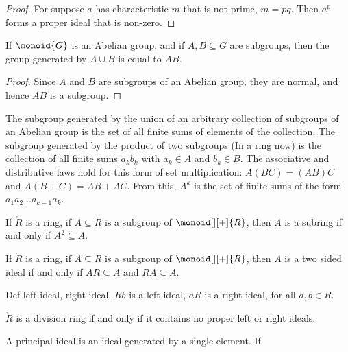 \documentclass{book}                                                           %
\begin{document}
            \begin{proof}
                For suppose $a$ has characteristic $m$ that is not prime,
                $m=pq$. Then $a^{p}$ forms a proper ideal that is non-zero.
            \end{proof}
            \begin{theorem}
                If $\monoid{G}$ is an Abelian group, and if
                $A,B\subseteq{G}$ are subgroups, then the group generated
                by $A\cup{B}$ is equal to $AB$.
            \end{theorem}
            \begin{proof}
                Since $A$ and $B$ are subgroups of an Abelian group, they
                are normal, and hence $AB$ is a subgroup.
            \end{proof}
            The subgroup generated by the union of an arbitrary collection
            of subgroups of an Abelian group is the set of all finite sums
            of elements of the collection. The subgroup generated by the
            product of two subgroups (In a ring now) is the collection of
            all finite sums $a_{k}b_{k}$ with $a_{k}\in{A}$ and
            $b_{k}\in{B}$. The associative and distributive laws hold for
            this form of set multiplication: $A(BC)=(AB)C$ and
            $A(B+C)=AB+AC$. From this, $A^{k}$ is the set of finite sums of
            the form $a_{1}a_{2}\dots{a}_{k-1}a_{k}$.
            \begin{theorem}
                If $\ring{R}$ is a ring, if $A\subseteq{R}$ is a subgroup of
                $\monoid[][+]{R}$, then $A$ is a subring if and only if
                $A^{2}\subseteq{A}$.
            \end{theorem}
            \begin{theorem}
                If $\ring{R}$ is a ring, if $A\subseteq{R}$ is a subgroup of
                $\monoid[][+]{R}$, then $A$ is a two sided ideal if and
                only if $AR\subseteq{A}$ and $RA\subseteq{A}$.
            \end{theorem}
            Def left ideal, right ideal. $Rb$ is a left ideal,
            $aR$ is a right ideal, for all $a,b\in{R}$.
            \begin{theorem}
                $\ring{R}$ is a division ring if and only if it contains no
                proper left or right ideals.
            \end{theorem}
            A principal ideal is an ideal generated by a single element. If
\end{document}
